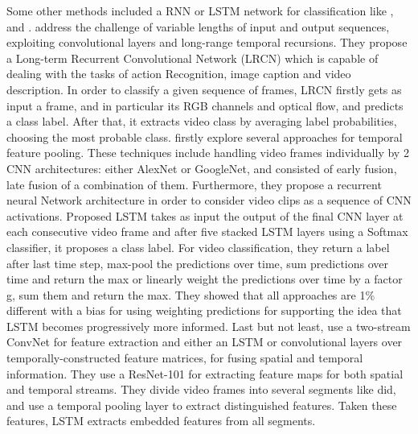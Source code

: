 Some other methods included a RNN or LSTM network for classification like \cite{DBLP:journals/corr/DonahueHGRVSD14}, \cite{DBLP:journals/corr/NgHVVMT15} and \cite{DBLP:journals/corr/MaCKA17}.  \cite{DBLP:journals/corr/DonahueHGRVSD14} address the challenge of variable lengths of
input and output sequences, exploiting convolutional layers and long-range temporal recursions. They propose a Long-term Recurrent
Convolutional Network (LRCN) which is capable of dealing with the tasks of action Recognition, image caption and video description. In order to classify a given sequence of frames, LRCN firstly gets as input a frame, and in particular its RGB channels and optical flow, and predicts a class label. After that, it extracts video class by averaging label probabilities, choosing the most probable class.
\cite{DBLP:journals/corr/NgHVVMT15} firstly explore several approaches for temporal feature pooling. These techniques include handling video
frames individually by 2 CNN architectures: either AlexNet or GoogleNet, and consisted of early fusion, late fusion of a combination of
them. Furthermore, they propose a recurrent neural Network architecture in order to consider video clips as a sequence of CNN activations.
Proposed LSTM takes as input the output of the final CNN layer at each consecutive video frame and after five stacked LSTM layers using a
Softmax classifier, it proposes a class label. For video classification, they return a label after last time step, max-pool the predictions
over time, sum predictions over time and return the max or linearly weight the predictions over time by a factor g, sum them and return the max.
They showed that all approaches are 1\% different with a bias for using weighting predictions for supporting the idea that LSTM becomes progressively more informed. Last but not least,  \cite{DBLP:journals/corr/MaCKA17} use a two-stream ConvNet for feature extraction and either an LSTM or convolutional layers over temporally-constructed feature matrices, for fusing spatial and temporal information. They use a ResNet-101 for
extracting feature maps for both spatial and temporal streams. They divide video frames into several segments like \cite{DBLP:journals/corr/WangXW0LTG16} did, and use a temporal pooling layer to extract distinguished features. Taken these features, LSTM extracts embedded features from all segments.\par

